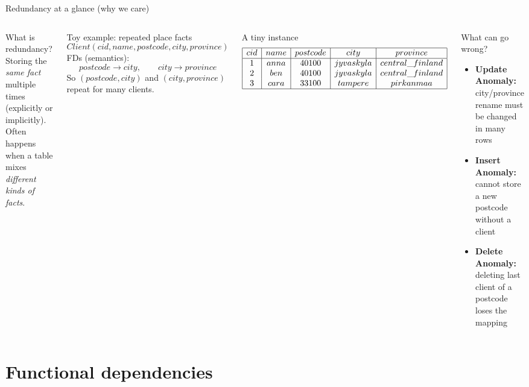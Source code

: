 \documentclass[10pt,aspectratio=169]{beamer}
\newenvironment{examplebox}[1][Example]{\begin{exampleblock}{#1}}{\end{exampleblock}}
\begin{document}

\begin{frame}{Redundancy at a glance (why we care)}
\small
\begin{columns}[T,onlytextwidth]
\begin{block}{What is redundancy?}
Storing the \emph{same fact} multiple times (explicitly or implicitly).\\
Often happens when a table mixes \emph{different kinds of facts}.
\end{block}

\begin{examplebox}[Toy example: repeated place facts]
\[
Client(cid,name,postcode,city,province)
\]
FDs (semantics):
\[
postcode \rightarrow city,\qquad city \rightarrow province
\]
So \((postcode,city)\) and \((city,province)\) repeat for many clients.
\end{examplebox}

\begin{examplebox}[A tiny instance]
\scriptsize
\[
\begin{array}{|c|c|c|c|c|}\hline
cid&name&postcode&city&province\\\hline
1&anna&40100&jyvaskyla&central\_finland\\
2&ben&40100&jyvaskyla&central\_finland\\
3&cara&33100&tampere&pirkanmaa\\\hline
\end{array}
\]
\end{examplebox}

\begin{block}{What can go wrong?}
\begin{itemize}
  \item \textbf{Update Anomaly:} city/province rename must be changed in many rows
  \item \textbf{Insert Anomaly:} cannot store a new postcode without a client
  \item \textbf{Delete Anomaly:} deleting last client of a postcode loses the mapping
\end{itemize}
\end{block}
\end{columns}
\end{frame}

\section{Functional dependencies}
\end{document}
